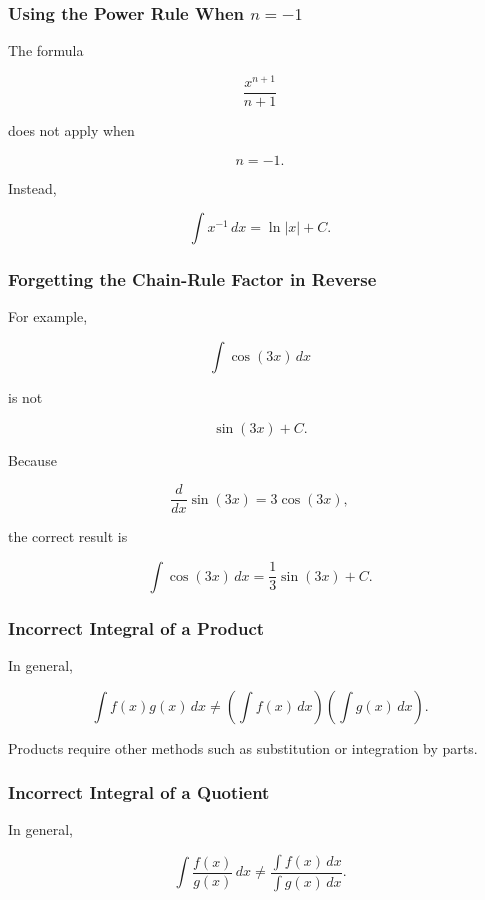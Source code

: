 \subsubsection{Using the Power Rule When \(n=-1\)}

The formula

\[
\frac{
x^{n+1}
}{
n+1
}
\]

does not apply when

\[
n=-1.
\]

Instead,

\[
\boxed{
\int x^{-1}\,dx
=
\ln|x|+C.
}
\]

\subsubsection{Forgetting the Chain-Rule Factor in Reverse}

For example,

\[
\int
\cos(3x)\,dx
\]

is not

\[
\sin(3x)+C.
\]

Because

\[
\frac{d}{dx}
\sin(3x)
=
3\cos(3x),
\]

the correct result is

\[
\boxed{
\int
\cos(3x)\,dx
=
\frac13
\sin(3x)+C.
}
\]

\subsubsection{Incorrect Integral of a Product}

In general,

\[
\boxed{
\int
f(x)g(x)\,dx
\neq
\left(
\int f(x)\,dx
\right)
\left(
\int g(x)\,dx
\right).
}
\]

Products require other methods such as substitution or integration by parts.

\subsubsection{Incorrect Integral of a Quotient}

In general,

\[
\boxed{
\int
\frac{
f(x)
}{
g(x)
}
\,dx
\neq
\frac{
\int f(x)\,dx
}{
\int g(x)\,dx
}.
}
\]

